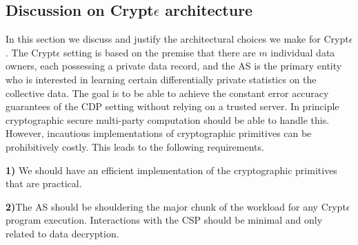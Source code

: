 \subsection{Discussion on Crypt$\epsilon$ architecture}


In this section we discuss and justify the architectural choices we make for Crypt$\epsilon$. The Crypt$\epsilon$ setting is based on the premise that there are $m$ individual data owners, each possessing a private data record, and the \textsf{AS} is the primary entity who is interested in learning certain differentially private statistics on the collective data. The goal is to be able to achieve the constant error accuracy guarantees of the \textsf{CDP} setting without relying on a trusted server. In principle cryptographic secure multi-party computation should be able to handle this. However, incautious implementations of cryptographic primitives can be prohibitively costly. This leads to the following requirements.

\textbf{1)} We should have an efficient implementation of the cryptographic primitives that are practical.

\textbf{2)}The \textsf{AS} should be shouldering the major chunk of the workload for any Crypt$\epsilon$ program execution. Interactions with the \textsf{CSP} should be minimal and only related to data decryption.

